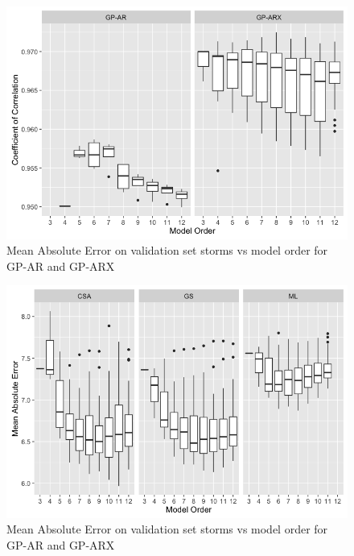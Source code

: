 \documentclass[sw, draft]{AGUTeX}
\begin{document}
\begin{figure}
\noindent\includegraphics[width=\textwidth]{Compare-cc.png}
\caption{Mean Absolute Error on validation set storms vs model order for GP-AR and GP-ARX}
\label{fig:CompareCC}
\end{figure}


\begin{figure}
\noindent\includegraphics[width=\textwidth]{Compare-mae-arx.png}
\caption{Mean Absolute Error on validation set storms vs model order for GP-AR and GP-ARX}
\label{fig:CompareMaeARX}
\end{figure}
\end{document}
